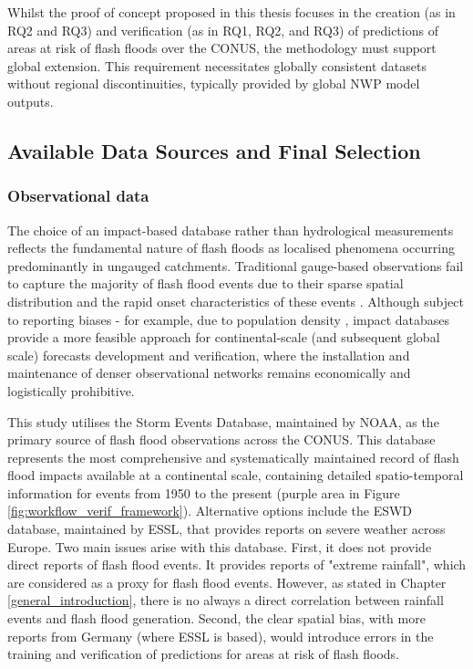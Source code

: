 Whilst  the proof of concept proposed in this thesis focuses in the creation (as in RQ2 and RQ3) and verification (as in RQ1, RQ2, and RQ3) of predictions of areas at risk of flash floods over the CONUS, the methodology must support global extension. This requirement necessitates globally consistent datasets without regional discontinuities, typically provided by global NWP model outputs.


\subsection{Available Data Sources and Final Selection}

\subsubsection{Observational data}

The choice of an impact-based database rather than hydrological measurements reflects the fundamental nature of flash floods as localised phenomena occurring predominantly in ungauged catchments. Traditional gauge-based observations fail to capture the majority of flash flood events due to their sparse spatial distribution and the rapid onset characteristics of these events \citep{Gaume_2009, Gaume_2016}. Although subject to reporting biases - for example, due to population density \citep{Marjerison_2016}, impact databases provide a more feasible approach for continental-scale (and subsequent global scale) forecasts development and verification, where the installation and maintenance of denser observational networks remains economically and logistically prohibitive.

This study utilises the Storm Events Database, maintained by NOAA, as the primary source of flash flood observations across the CONUS. This database represents the most comprehensive and systematically maintained record of flash flood impacts available at a continental scale, containing detailed spatio-temporal information for events from 1950 to the present (purple area in Figure \ref{fig:workflow_verif_framework}). Alternative options include the ESWD database, maintained by ESSL, that provides reports on severe weather across Europe. Two main issues arise with this database. First, it does not provide direct reports of flash flood events. It provides reports of "extreme rainfall", which are considered as a proxy for flash flood events. However, as stated in Chapter \ref{general_introduction}, there is no always a direct correlation between rainfall events and flash flood generation. Second, the clear spatial bias, with more reports from Germany (where ESSL is based), would introduce errors in the training and verification of predictions for areas at risk of flash floods.

